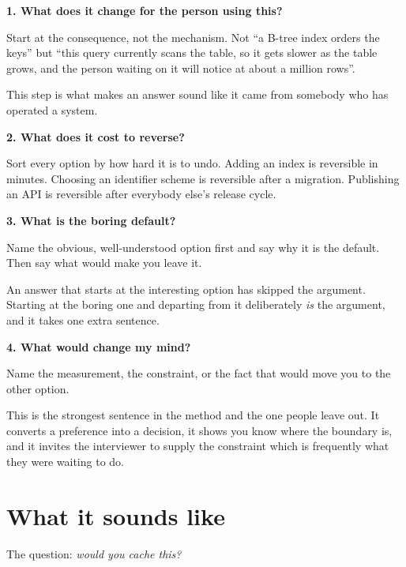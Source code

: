 \begin{kitmethod}
\textbf{1. What does it change for the person using this?}

Start at the consequence, not the mechanism. Not ``a B-tree index orders the
keys'' but ``this query currently scans the table, so it gets slower as the
table grows, and the person waiting on it will notice at about a million rows''.

This step is what makes an answer sound like it came from somebody who has
operated a system.

\textbf{2. What does it cost to reverse?}

Sort every option by how hard it is to undo. Adding an index is reversible in
minutes. Choosing an identifier scheme is reversible after a migration.
Publishing an API is reversible after everybody else's release cycle.


\textbf{3. What is the boring default?}

Name the obvious, well-understood option first and say why it is the default.
Then say what would make you leave it.

An answer that starts at the interesting option has skipped the argument.
Starting at the boring one and departing from it deliberately \emph{is} the
argument, and it takes one extra sentence.

\textbf{4. What would change my mind?}

Name the measurement, the constraint, or the fact that would move you to the
other option.

This is the strongest sentence in the method and the one people leave out. It
converts a preference into a decision, it shows you know where the boundary is,
and it invites the interviewer to supply the constraint \dash{} which is
frequently what they were waiting to do.
\end{kitmethod}

\section{What it sounds like}

The question: \emph{would you cache this?}

